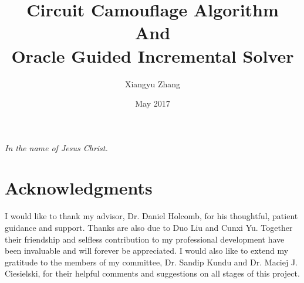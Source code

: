 \documentclass[proposal]{umassthesis}  %
\begin{document}
\title{Circuit Camouflage Algorithm\protect\\And\protect\\Oracle Guided Incremental Solver}
\author{Xiangyu Zhang}
\date{May 2017} %




\frontmatter
\maketitle
\signaturepage

\begin{dedication}              %
  \begin{center}
    \emph{In the name of Jesus Christ.}
  \end{center}
\end{dedication}


%
%
\chapter{Acknowledgments}             %
I would like to thank my advisor, Dr. Daniel Holcomb, for his thoughtful, patient guidance and support. Thanks are also due to Duo Liu and Cunxi Yu. Together their friendship and selfless contribution to my professional development have been invaluable and will forever be appreciated. I would also like to extend my gratitude to the members of my committee, Dr. Sandip Kundu and Dr. Maciej J. Ciesielski, for their helpful comments and suggestions on all stages of this project.\\
\end{document}
